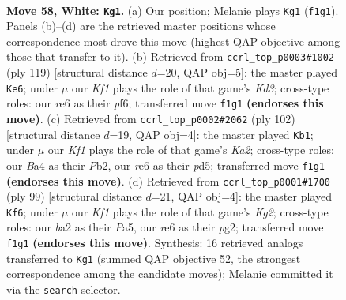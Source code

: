 \documentclass[11pt]{article}
\begin{document}
\clearpage

\begin{figure}[p]\centering
\begin{subfigure}{0.46\textwidth}\centering
\resizebox{\linewidth}{!}{%
\newchessgame
\chessboard[
  setfen={1R6/7k/4r3/8/B3p2p/4Bp1P/b4P2/5K2 w - - 26 58},
  showmover=false,
  pgfstyle=straightmove, color=movearrow, markmove={f1-g1}
]}
\caption{}
\end{subfigure}\hfill
\begin{subfigure}{0.46\textwidth}\centering
\resizebox{\linewidth}{!}{%
\newchessgame
\chessboard[
  setfen={7B/7p/3k1P1P/8/p7/Pb1K4/1P6/8 b - - 18 60},
  showmover=false,
  pgfstyle=straightmove, color=movearrow, markmove={d6-e6}
]}
\caption{}
\end{subfigure}
\\[4pt]
\begin{subfigure}{0.46\textwidth}\centering
\resizebox{\linewidth}{!}{%
\newchessgame
\chessboard[
  setfen={8/3k4/5b2/p2p4/Pp1p4/3B4/KPP5/8 w - - 4 52},
  showmover=false,
  pgfstyle=straightmove, color=movearrow, markmove={a2-b1}
]}
\caption{}
\end{subfigure}\hfill
\begin{subfigure}{0.46\textwidth}\centering
\resizebox{\linewidth}{!}{%
\newchessgame
\chessboard[
  setfen={3b4/6k1/7p/p6P/1p1K2P1/8/P5P1/3B4 b - - 18 50},
  showmover=false,
  pgfstyle=straightmove, color=movearrow, markmove={g7-f6}
]}
\caption{}
\end{subfigure}
\caption{\textbf{Move 58, White: \texttt{Kg1}.} (a) Our position; Melanie plays \texttt{Kg1} (\texttt{f1g1}). Panels (b)--(d) are the retrieved master positions whose correspondence most drove this move (highest QAP objective among those that transfer to it). (b) Retrieved from \texttt{ccrl\_top\_p0003\#1002} (ply 119) [structural distance $d$=20, QAP obj=5]: the master played \texttt{Ke6}; under $\mu$ our \emph{Kf1} plays the role of that game's \emph{Kd3}; cross-type roles: our \emph{r}e6 as their \emph{p}f6; transferred move \texttt{f1g1} \textbf{(endorses this move)}. (c) Retrieved from \texttt{ccrl\_top\_p0002\#2062} (ply 102) [structural distance $d$=19, QAP obj=4]: the master played \texttt{Kb1}; under $\mu$ our \emph{Kf1} plays the role of that game's \emph{Ka2}; cross-type roles: our \emph{B}a4 as their \emph{P}b2, our \emph{r}e6 as their \emph{p}d5; transferred move \texttt{f1g1} \textbf{(endorses this move)}. (d) Retrieved from \texttt{ccrl\_top\_p0001\#1700} (ply 99) [structural distance $d$=21, QAP obj=4]: the master played \texttt{Kf6}; under $\mu$ our \emph{Kf1} plays the role of that game's \emph{Kg2}; cross-type roles: our \emph{b}a2 as their \emph{P}a5, our \emph{r}e6 as their \emph{p}g2; transferred move \texttt{f1g1} \textbf{(endorses this move)}. Synthesis: 16 retrieved analogs transferred to \texttt{Kg1} (summed QAP objective 52, the strongest correspondence among the candidate moves); Melanie committed it via the \texttt{search} selector.}
\label{fig:thought-m114}
\end{figure}
\end{document}
